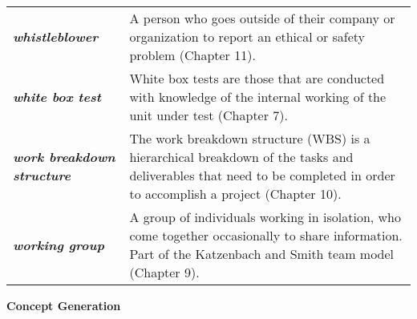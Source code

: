 \begin{longtable}[]{@{}
  >{\raggedright\arraybackslash}p{}
  >{\raggedright\arraybackslash}p{}@{}}
\emph{\textbf{whistleblower}} & A person who goes outside of their
company or organization to report an ethical or safety problem (Chapter
11). \\
\emph{\textbf{white box test}} & White box tests are those that are
conducted with knowledge of the internal working of the unit under test
(Chapter 7). \\
\emph{\textbf{work breakdown structure}} & The work breakdown structure
(WBS) is a hierarchical breakdown of the tasks and deliverables that
need to be completed in order to accomplish a project (Chapter 10). \\
\emph{\textbf{working group}} & A group of individuals working in
isolation, who come together occasionally to share information. Part of
the Katzenbach and Smith team model (Chapter 9). \\
\end{longtable}

\textbf{Concept Generation}
